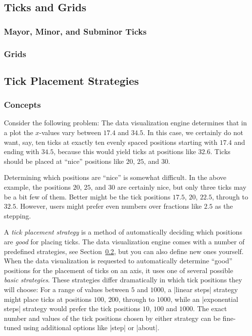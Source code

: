 \subsection{Ticks and Grids}
\label{section-dv-ticks-and-grids}

\subsubsection{Mayor, Minor, and Subminor Ticks}


\subsubsection{Grids}


\subsection{Tick Placement Strategies}
\label{section-dv-tick-placement-strategies}

\subsubsection{Concepts}
\label{section-dv-concept-tick-placement-strategies}

Consider the following problem: The data visualization engine
determines that in a
plot the $x$-values vary between $17.4$ and $34.5$. In this case, we
certainly do not want, say, ten ticks at exactly ten evenly spaced
positions starting with $17.4$ and ending with $34.5$, because this
would yield ticks at positions like $32.6$. Ticks should be placed at
``nice'' positions like $20$, $25$, and $30$.

Determining which positions are ``nice'' is somewhat difficult. In the
above example, the positions $20$, $25$, and $30$ are certainly nice,
but only three ticks may be a bit few of them. Better might be the
tick positions $17.5$, $20$, $22.5$, through to $32.5$. However, users
might prefer even numbers over fractions like $2.5$ as the stepping.

A \emph{tick placement strategy} is a method of automatically deciding
which positions are \emph{good} for placing ticks. The data
visualization engine comes with a number of predefined strategies, see
Section~\ref{section-dv-tick-placement-strategies}, but you can also
define new ones yourself. When the data visualization is requested to
automatically determine
``good'' positions for the placement of ticks on an axis, it uses one
of several possible \emph{basic strategies}. These strategies differ
dramatically in which tick positions they will choose: For a range of
values between $5$ and $1000$, a |linear steps| strategy might place
ticks at positions $100$, $200$, through to $1000$, while an
|exponential steps| strategy would prefer the tick positions $10$,
$100$ and $1000$. The exact number and values of the tick positions
chosen by either strategy can be fine-tuned using additional options
like |step| or |about|.

